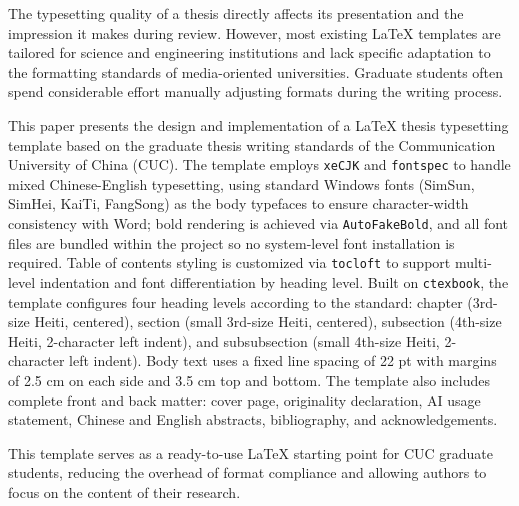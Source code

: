 \begin{enabstract}
The typesetting quality of a thesis directly affects its presentation and the impression it makes during review. However, most existing \LaTeX{} templates are tailored for science and engineering institutions and lack specific adaptation to the formatting standards of media-oriented universities. Graduate students often spend considerable effort manually adjusting formats during the writing process.

This paper presents the design and implementation of a \LaTeX{} thesis typesetting template based on the graduate thesis writing standards of the Communication University of China (CUC). The template employs \texttt{xeCJK} and \texttt{fontspec} to handle mixed Chinese-English typesetting, using standard Windows fonts (SimSun, SimHei, KaiTi, FangSong) as the body typefaces to ensure character-width consistency with Word; bold rendering is achieved via \texttt{AutoFakeBold}, and all font files are bundled within the project so no system-level font installation is required. Table of contents styling is customized via \texttt{tocloft} to support multi-level indentation and font differentiation by heading level. Built on \texttt{ctexbook}, the template configures four heading levels according to the standard: chapter (3rd-size Heiti, centered), section (small 3rd-size Heiti, centered), subsection (4th-size Heiti, 2-character left indent), and subsubsection (small 4th-size Heiti, 2-character left indent). Body text uses a fixed line spacing of 22 pt with margins of 2.5 cm on each side and 3.5 cm top and bottom. The template also includes complete front and back matter: cover page, originality declaration, AI usage statement, Chinese and English abstracts, bibliography, and acknowledgements.

This template serves as a ready-to-use \LaTeX{} starting point for CUC graduate students, reducing the overhead of format compliance and allowing authors to focus on the content of their research.
\end{enabstract}
